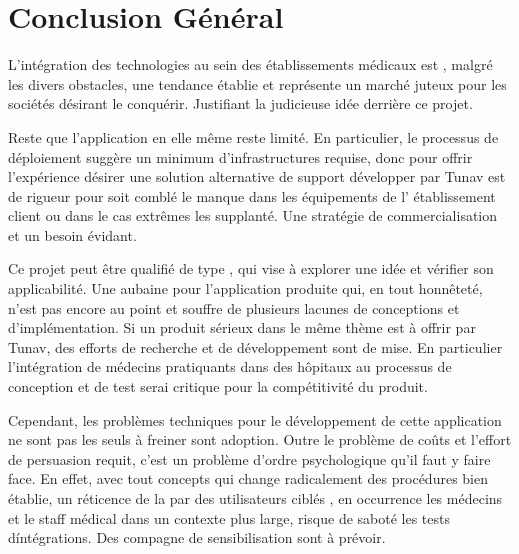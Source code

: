 
\chapter{Conclusion Général}   

L'intégration des technologies au sein des établissements médicaux est , malgré
les divers obstacles, une tendance établie et représente un marché juteux pour
les sociétés désirant le conquérir. Justifiant la judicieuse idée derrière ce
projet.

Reste que l'application en elle même reste limité. En particulier, le processus
de déploiement  suggère un minimum d'infrastructures requise, donc pour offrir
l'expérience désirer une solution alternative de support développer par Tunav
est de rigueur pour soit comblé le manque dans les équipements de
l’ établissement client ou dans le cas extrêmes les supplanté. Une stratégie de
commercialisation et un besoin évidant.

Ce projet peut être qualifié de type , qui vise à explorer
une idée et vérifier son applicabilité. Une aubaine pour l'application produite
qui, en tout honnêteté, n'est pas encore au point et souffre de plusieurs
lacunes de conceptions et d'implémentation. Si un produit sérieux dans le même
thème est à offrir par Tunav, des efforts de recherche et de développement sont
de mise. En particulier l'intégration de médecins pratiquants dans des hôpitaux
au processus de conception et de test serai critique pour la compétitivité du
produit.

Cependant, les problèmes techniques pour le développement de cette application
ne sont pas les seuls à freiner sont adoption. Outre le problème de coûts  et
l'effort de persuasion requit, c'est un problème d'ordre psychologique qu'il
faut y faire face. En effet, avec tout concepts qui change radicalement des
procédures bien établie, un réticence de la par des utilisateurs ciblés , en
occurrence les médecins et le staff médical dans un contexte plus large, risque
de saboté les tests d\'intégrations. Des compagne de sensibilisation sont à
prévoir.
